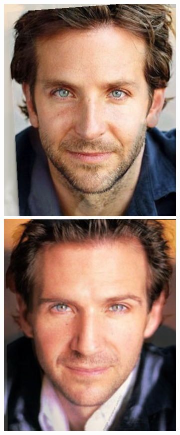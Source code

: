 \documentclass[conference]{IEEEtran}
\begin{document}
\begin{figure}[H]
\begin{multicols}{3}
    \includegraphics[width=1.0\linewidth]{results/faces/B/img10.png} \par
    \includegraphics[width=1.0\linewidth]{results/faces/B/img40.png} \par


\end{multicols}
\end{figure}
\end{document}
